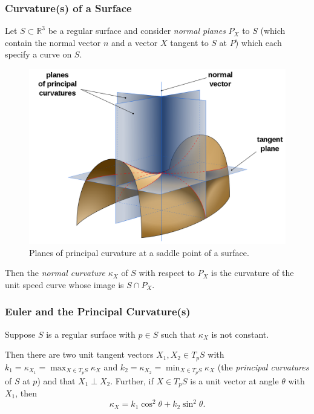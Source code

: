 \documentclass[handout]{beamer}
\newcommand{\R}{\mathbb{R}}
\theoremstyle{definition}
\begin{document}



\begin{frame}
    \frametitle{Curvature(s) of a Surface}

    \pause
    Let $S \subset \R^3$ be a regular surface and consider \emph{normal planes}
    $P_X$ to $S$ (which contain the normal vector $n$ and a vector $X$ tangent to
    $S$ at $P$) which each specify a curve on $S$.

    \begin{figure}
        \centering
        \includegraphics[width=.4\textwidth]{images/planes-of-curvature.png}
        \caption{Planes of principal curvature at a saddle point of a surface.}
    \end{figure}

    \pause
    Then the \emph{normal curvature} $\kappa_X$ of $S$ with respect to $P_X$
    is the curvature of the unit speed curve whose image is $S \cap P_X$.

\end{frame}

\begin{frame}
    \frametitle{Euler and the Principal Curvature(s)}

    \pause
    \begin{theorem}[Euler, 1760]
        Suppose $S$ is a regular surface with $p \in S$ such that $\kappa_X$
        is not constant.

        Then there are two unit tangent vectors $X_1, X_2 \in T_pS$ with
        $k_1 = \kappa_{X_1} = \max_{X \in T_pS}\kappa_X$ and
        $k_2 = \kappa_{X_2} = \min_{X \in T_pS}\kappa_X$
        (the \emph{principal curvatures} of $S$ at $p$)
        and that $X_1 \perp X_2$. Further, if $X \in T_pS$ is a unit vector
        at angle $\theta$ with $X_1$, then
        \pause
        \[
          \kappa_X = k_1\cos^2\theta + k_2\sin^2\theta.
        \]
    \end{theorem}

\end{frame}
\end{document}
